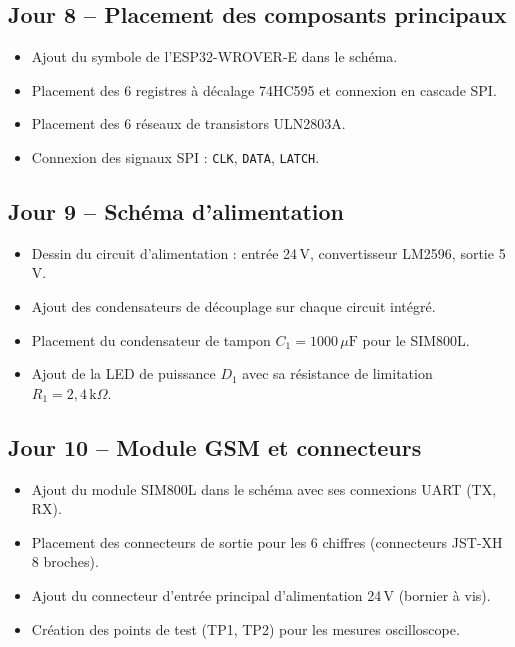\documentclass[12pt,a4paper]{article}
\begin{document}
\subsection*{Jour 8 -- Placement des composants principaux}
\begin{itemize}
    \item Ajout du symbole de l'ESP32-WROVER-E dans le schéma.
    \item Placement des 6 registres à décalage 74HC595 et connexion en cascade SPI.
    \item Placement des 6 réseaux de transistors ULN2803A.
    \item Connexion des signaux SPI : \texttt{CLK}, \texttt{DATA}, \texttt{LATCH}.
\end{itemize}

\subsection*{Jour 9 -- Schéma d'alimentation}
\begin{itemize}
    \item Dessin du circuit d'alimentation : entrée 24\,V, convertisseur LM2596, sortie 5\,V.
    \item Ajout des condensateurs de découplage sur chaque circuit intégré.
    \item Placement du condensateur de tampon $C_1 = 1000\,\mu\text{F}$ pour le SIM800L.
    \item Ajout de la LED de puissance $D_1$ avec sa résistance de limitation $R_1 = 2{,}4\,\text{k}\Omega$.
\end{itemize}

\subsection*{Jour 10 -- Module GSM et connecteurs}
\begin{itemize}
    \item Ajout du module SIM800L dans le schéma avec ses connexions UART (TX, RX).
    \item Placement des connecteurs de sortie pour les 6 chiffres (connecteurs JST-XH 8 broches).
    \item Ajout du connecteur d'entrée principal d'alimentation 24\,V (bornier à vis).
    \item Création des points de test (TP1, TP2) pour les mesures oscilloscope.
\end{itemize}
\end{document}
